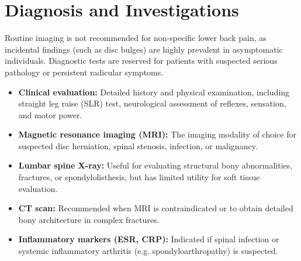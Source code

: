 \section*{Diagnosis and Investigations}
Routine imaging is not recommended for non-specific lower back pain, as incidental findings (such as disc bulges) are highly prevalent in asymptomatic individuals. Diagnostic tests are reserved for patients with suspected serious pathology or persistent radicular symptoms.
\begin{itemize}
    \item \textbf{Clinical evaluation:} Detailed history and physical examination, including straight leg raise (SLR) test, neurological assessment of reflexes, sensation, and motor power.
    \item \textbf{Magnetic resonance imaging (MRI):} The imaging modality of choice for suspected disc herniation, spinal stenosis, infection, or malignancy.
    \item \textbf{Lumbar spine X-ray:} Useful for evaluating structural bony abnormalities, fractures, or spondylolisthesis, but has limited utility for soft tissue evaluation.
    \item \textbf{CT scan:} Recommended when MRI is contraindicated or to obtain detailed bony architecture in complex fractures.
    \item \textbf{Inflammatory markers (ESR, CRP):} Indicated if spinal infection or systemic inflammatory arthritis (e.g. spondyloarthropathy) is suspected.
\end{itemize}

